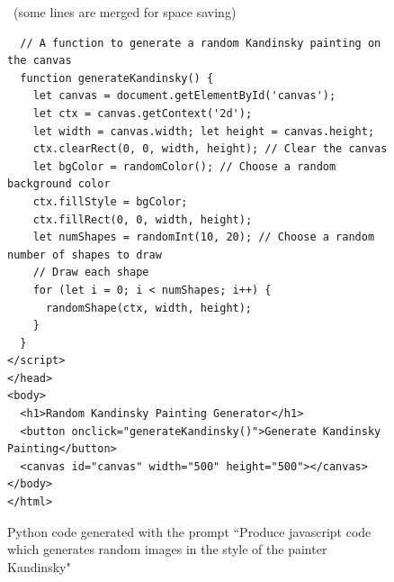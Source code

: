 \begin{figure}[H]
\begin{AIbox}{\DV\ (some lines are merged for space saving)}
\begin{verbatim}
  // A function to generate a random Kandinsky painting on the canvas
  function generateKandinsky() {
    let canvas = document.getElementById('canvas');
    let ctx = canvas.getContext('2d');
    let width = canvas.width; let height = canvas.height;
    ctx.clearRect(0, 0, width, height); // Clear the canvas
    let bgColor = randomColor(); // Choose a random background color
    ctx.fillStyle = bgColor;
    ctx.fillRect(0, 0, width, height);
    let numShapes = randomInt(10, 20); // Choose a random number of shapes to draw
    // Draw each shape
    for (let i = 0; i < numShapes; i++) {
      randomShape(ctx, width, height);
    }
  }
</script>
</head>
<body>
  <h1>Random Kandinsky Painting Generator</h1>
  <button onclick="generateKandinsky()">Generate Kandinsky Painting</button>
  <canvas id="canvas" width="500" height="500"></canvas>
</body>
</html>
\end{verbatim}
\end{AIbox}
	\caption{Python code generated with the prompt ``Produce javascript code which generates random images in the style of the painter Kandinsky"}
	\label{fig:artprog1}
\end{figure}


